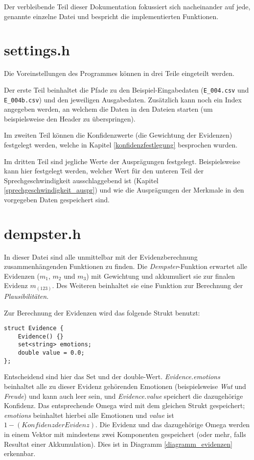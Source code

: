  Der verbleibende Teil dieser Dokumentation fokussiert sich nacheinander auf jede, genannte einzelne Datei und bespricht die implementierten Funktionen.

\section{settings.h}
Die Voreinstellungen des Programmes können in drei Teile eingeteilt werden.

Der erste Teil beinhaltet die Pfade zu den Beispiel-Eingabedaten (\verb|E_004.csv| und \verb|E_004b.csv|) und den jeweiligen Ausgabedaten. Zusätzlich kann noch ein Index angegeben werden, an welchem die Daten in den Dateien starten (um beispielsweise den Header zu überspringen).

Im zweiten Teil können die Konfidenzwerte (die Gewichtung der Evidenzen) festgelegt werden, welche in Kapitel \ref{konfidenzfestlegung} besprochen wurden. 

Im dritten Teil sind jegliche Werte der Ausprägungen festgelegt. Beispielsweise kann hier festgelegt werden, welcher Wert für den unteren Teil der Sprechgeschwindigkeit ausschlaggebend ist (Kapitel \ref{sprechgeschwindigkeit_auspr}) und wie die Ausprägungen der Merkmale in den vorgegeben Daten gespeichert sind.

\section{dempster.h}
In dieser Datei sind alle unmittelbar mit der Evidenzberechnung zusammenhängenden Funktionen zu finden. Die \textit{Dempster}-Funktion erwartet alle Evidenzen (\(m_1\), \(m_2\) und \(m_3\)) mit Gewichtung und akkumuliert sie zur finalen Evidenz \(m_(123)\). Des Weiteren beinhaltet sie eine Funktion zur Berechnung der \textit{Plausibilitäten}.

Zur Berechnung der Evidenzen wird das folgende Strukt benutzt:

\begin{lstlisting}[caption=Strukt zur Evidenzberechnung, label=structcode]
struct Evidence {
	Evidence() {}
	set<string> emotions;
	double value = 0.0;
};
\end{lstlisting}


Entscheidend sind hier das Set und der double-Wert. \textit{Evidence.emotions} beinhaltet alle zu dieser Evidenz gehörenden Emotionen (beispielsweise \textit{Wut} und \textit{Freude}) und kann auch leer sein, und \textit{Evidence.value} speichert die dazugehörige Konfidenz. Das entsprechende Omega wird mit dem gleichen Strukt gespeichert; \textit{emotions} beinhaltet hierbei alle Emotionen und \textit{value} ist \(1 - (Konfidenz der Evidenz)\). Die Evidenz und das dazugehörige Omega werden in einem Vektor mit mindestens zwei Komponenten gespeichert (oder mehr, falls Resultat einer Akkumulation). Dies ist in Diagramm \ref{diagramm_evidenzen} erkennbar.


